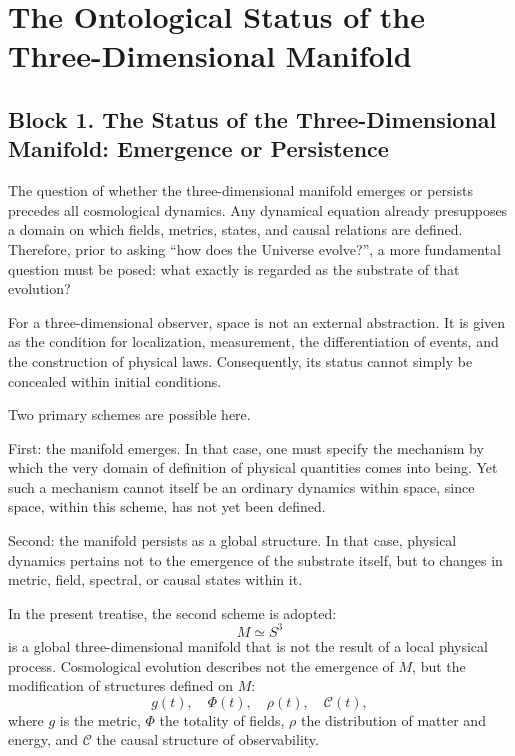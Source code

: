 \documentclass[12pt,a4paper]{article}
\theoremstyle{definition}
\begin{document}
\clearpage
\setcounter{page}{3}
\tableofcontents

\clearpage

\section{The Ontological Status of the Three-Dimensional Manifold}
\subsection{Block 1. The Status of the Three-Dimensional Manifold: Emergence or Persistence}
The question of whether the three-dimensional manifold emerges or persists precedes all cosmological dynamics. Any dynamical equation already presupposes a domain on which fields, metrics, states, and causal relations are defined. Therefore, prior to asking ``how does the Universe evolve?'', a more fundamental question must be posed: what exactly is regarded as the substrate of that evolution?

For a three-dimensional observer, space is not an external abstraction. It is given as the condition for localization, measurement, the differentiation of events, and the construction of physical laws. Consequently, its status cannot simply be concealed within initial conditions.

Two primary schemes are possible here.

First: the manifold emerges. In that case, one must specify the mechanism by which the very domain of definition of physical quantities comes into being. Yet such a mechanism cannot itself be an ordinary dynamics within space, since space, within this scheme, has not yet been defined.

Second: the manifold persists as a global structure. In that case, physical dynamics pertains not to the emergence of the substrate itself, but to changes in metric, field, spectral, or causal states within it.

In the present treatise, the second scheme is adopted:
\[
M \simeq S^3
\]
is a global three-dimensional manifold that is not the result of a local physical process. Cosmological evolution describes not the emergence of \(M\), but the modification of structures defined on \(M\):
\[
g(t),\quad \Phi(t),\quad \rho(t),\quad \mathcal C(t),
\]
where \(g\) is the metric, \(\Phi\) the totality of fields, \(\rho\) the distribution of matter and energy, and \(\mathcal C\) the causal structure of observability.
\end{document}
